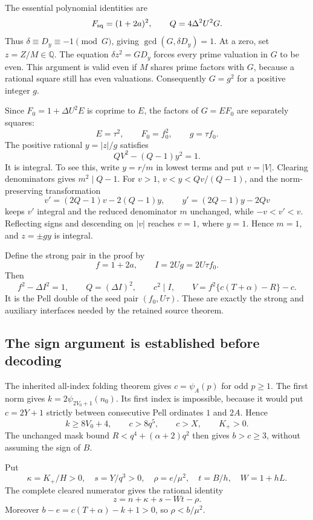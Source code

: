 The essential polynomial identities are
\begin{equation}
 F_{\rm sq}=(1+2a)^2,\qquad
 Q=4\Delta^2U^2G.
 \label{eq:doubling-gcd}
\end{equation}
Thus $\delta\equiv D_y\equiv-1\pmod G$, giving
$\gcd(G,\delta D_y)=1$.  At a zero, set $z=Z/M\in\mathbb Q$.
The equation $\delta z^2=GD_y$ forces every prime valuation in $G$
to be even.  This argument is valid even if $M$ shares prime factors
with $G$, because a rational square still has even valuations.
Consequently $G=g^2$ for a positive integer $g$.

Since $F_0=1+\Delta U^2E$ is coprime to $E$, the factors of
$G=EF_0$ are separately squares:
\[
 E=\tau^2,\qquad F_0=f_0^2,\qquad g=\tau f_0.
\]
The positive rational $y=|z|/g$ satisfies
\begin{equation}
 QV^2-(Q-1)y^2=1.
 \label{eq:doubling-adjacent}
\end{equation}
It is integral.  To see this, write $y=r/m$ in lowest terms and put
$v=|V|$.  Clearing denominators gives $m^2\mid Q-1$.  For $v>1$,
$v<y<Qv/(Q-1)$, and the norm-preserving transformation
\[
 v'=(2Q-1)v-2(Q-1)y,\qquad
 y'=(2Q-1)y-2Qv
\]
keeps $v'$ integral and the reduced denominator $m$ unchanged, while
$-v<v'<v$.  Reflecting signs and descending on $|v|$ reaches $v=1$,
where $y=1$.  Hence $m=1$, and $z=\pm gy$ is integral.

Define the strong pair in the proof by
\[
 f=1+2a,\qquad I=2Ug=2U\tau f_0.
\]
Then
\[
 f^2-\Delta I^2=1,\qquad Q=(\Delta I)^2,\qquad c^2\mid I,
 \qquad V=f^2\{c(T+\alpha)-R\}-c.
\]
It is the Pell double of the seed pair $(f_0,U\tau)$.  These are
exactly the strong and auxiliary interfaces needed by the retained
source theorem.

\subsection{The sign argument is established before decoding}

The inherited all-index folding theorem gives $c=\psi_A(p)$ for odd
$p\ge1$.  The first norm gives
$k=2\psi_{2V_0+1}(n_0)$.  Its first index is impossible, because it
would put $c=2Y+1$ strictly between consecutive Pell ordinates $1$
and $2A$.  Hence
\[
 k\ge8V_0+4,\qquad c>8q^5,\qquad c>X,\qquad K_+>0.
\]
The unchanged mask bound $R<q^4+(\alpha+2)q^2$ then gives $b>c\ge3$,
without assuming the sign of $B$.

Put
\[
 \kappa=K_+/H>0,\quad s=Y/q^3>0,\quad
 \rho=e/\mu^2,\quad t=B/h,\quad W=1+hL.
\]
The complete cleared numerator gives the rational identity
\begin{equation}
 z=n+\kappa+s-Wt-\rho.
 \label{eq:doubling-carrier}
\end{equation}
Moreover $b-e=c(T+\alpha)-k+1>0$, so $\rho<b/\mu^2$.

